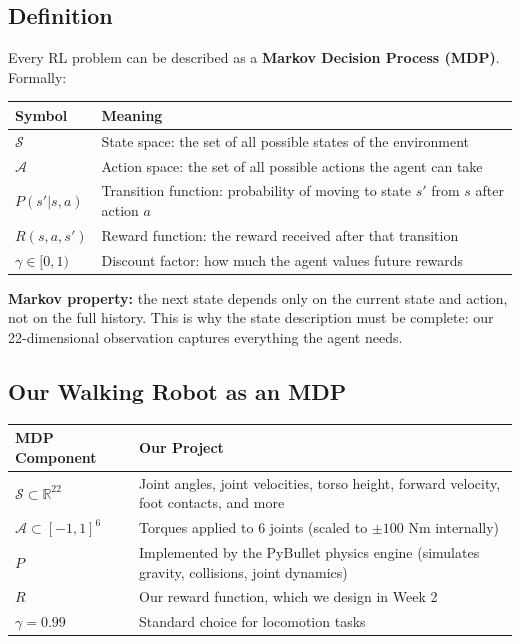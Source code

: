 \documentclass[12pt, a4paper]{article}
\begin{document}
\subsection{Definition}

Every RL problem can be described as a \textbf{Markov Decision Process (MDP)}. Formally:

\begin{center}
\begin{tabular}{ll}
    \toprule
    Symbol & Meaning \\
    \midrule
    $\mathcal{S}$ & State space: the set of all possible states of the environment \\
    $\mathcal{A}$ & Action space: the set of all possible actions the agent can take \\
    $P(s' | s, a)$ & Transition function: probability of moving to state $s'$ from $s$ after action $a$ \\
    $R(s, a, s')$ & Reward function: the reward received after that transition \\
    $\gamma \in [0,1)$ & Discount factor: how much the agent values future rewards \\
    \bottomrule
\end{tabular}
\end{center}

\textbf{Markov property:} the next state depends only on the current state and action, not on the full history. This is why the state description must be complete: our 22-dimensional observation captures everything the agent needs.

\subsection{Our Walking Robot as an MDP}

\begin{center}
\begin{tabular}{lp{9cm}}
    \toprule
    MDP Component & Our Project \\
    \midrule
    $\mathcal{S} \subset \mathbb{R}^{22}$ & Joint angles, joint velocities, torso height, forward velocity, foot contacts, and more \\
    $\mathcal{A} \subset [-1,1]^6$ & Torques applied to 6 joints (scaled to $\pm 100$ Nm internally) \\
    $P$ & Implemented by the PyBullet physics engine (simulates gravity, collisions, joint dynamics) \\
    $R$ & Our reward function, which we design in Week 2 \\
    $\gamma = 0.99$ & Standard choice for locomotion tasks \\
    \bottomrule
\end{tabular}
\end{center}
\end{document}
